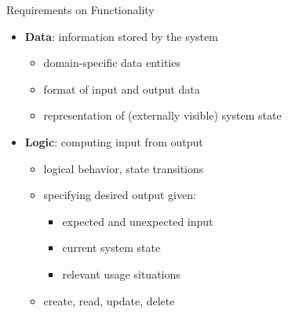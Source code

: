 \documentclass{simpleslides}
\begin{document}
\begin{frame}[fragile]{Requirements on Functionality}
\begin{minipage}[t]{0.7\textwidth}
\vspace{0pt}
\begin{itemize}
\item \textbf{Data}: information stored by the system 
\begin{itemize}
\item domain-specific data entities
\item format of input and output data
\item representation of (externally visible) system state
\end{itemize}
\item \textbf{Logic}: computing input from output 
\begin{itemize}
\item logical behavior, state transitions
\item specifying desired output given:
\begin{itemize}
  \item expected and unexpected input
  \item current system state
  \item relevant usage situations
\end{itemize}
\item create, read, update, delete
\end{itemize}
\end{itemize}
\end{minipage}%
\begin{minipage}[t]{0.3\textwidth}
\vspace{0pt}

\end{minipage}
\end{frame}
\end{document}
